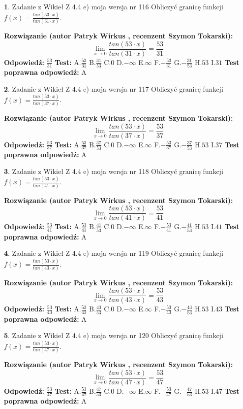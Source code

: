 \documentclass[12pt, a4paper]{article}
\theoremstyle{definition} %
\newtheorem{zad}{}
\newcommand{\zadStart}[1]{\begin{zad}#1\newline}
\newcommand{\zadStop}{\end{zad}}
\newcommand{\rozwStart}[2]{\noindent \textbf{Rozwiązanie (autor #1 , recenzent #2): }\newline}
\newcommand{\rozwStop}{\newline}
\newcommand{\odpStart}{\noindent \textbf{Odpowiedź:}\newline}
\newcommand{\odpStop}{\newline}
\newcommand{\testStart}{\noindent \textbf{Test:}\newline}
\newcommand{\testStop}{\newline}
\newcommand{\kluczStart}{\noindent \textbf{Test poprawna odpowiedź:}\newline}
\newcommand{\kluczStop}{\newline}
\begin{document}
\zadStart{Zadanie z Wikieł Z 4.4 e) moja wersja nr 116}
Obliczyć granicę funkcji $f(x)=\frac{tan(53\cdot x)}{tan(31\cdot x)}$.
\zadStop
\rozwStart{Patryk Wirkus}{Szymon Tokarski}
$$\lim\limits_{x\to 0}\frac{tan(53\cdot x)}{tan(31\cdot x)}=
\frac{53}{31}$$
\rozwStop
\odpStart
$\frac{53}{31}$
\odpStop
\testStart
A.$\frac{53}{31}$
B.$\frac{31}{53}$
C.$0$
D.$-\infty$
E.$\infty$
F.$-\frac{53}{31}$
G.$-\frac{31}{53}$
H.$53$
I.$31$
\testStop
\kluczStart
A
\kluczStop



\zadStart{Zadanie z Wikieł Z 4.4 e) moja wersja nr 117}
Obliczyć granicę funkcji $f(x)=\frac{tan(53\cdot x)}{tan(37\cdot x)}$.
\zadStop
\rozwStart{Patryk Wirkus}{Szymon Tokarski}
$$\lim\limits_{x\to 0}\frac{tan(53\cdot x)}{tan(37\cdot x)}=
\frac{53}{37}$$
\rozwStop
\odpStart
$\frac{53}{37}$
\odpStop
\testStart
A.$\frac{53}{37}$
B.$\frac{37}{53}$
C.$0$
D.$-\infty$
E.$\infty$
F.$-\frac{53}{37}$
G.$-\frac{37}{53}$
H.$53$
I.$37$
\testStop
\kluczStart
A
\kluczStop



\zadStart{Zadanie z Wikieł Z 4.4 e) moja wersja nr 118}
Obliczyć granicę funkcji $f(x)=\frac{tan(53\cdot x)}{tan(41\cdot x)}$.
\zadStop
\rozwStart{Patryk Wirkus}{Szymon Tokarski}
$$\lim\limits_{x\to 0}\frac{tan(53\cdot x)}{tan(41\cdot x)}=
\frac{53}{41}$$
\rozwStop
\odpStart
$\frac{53}{41}$
\odpStop
\testStart
A.$\frac{53}{41}$
B.$\frac{41}{53}$
C.$0$
D.$-\infty$
E.$\infty$
F.$-\frac{53}{41}$
G.$-\frac{41}{53}$
H.$53$
I.$41$
\testStop
\kluczStart
A
\kluczStop



\zadStart{Zadanie z Wikieł Z 4.4 e) moja wersja nr 119}
Obliczyć granicę funkcji $f(x)=\frac{tan(53\cdot x)}{tan(43\cdot x)}$.
\zadStop
\rozwStart{Patryk Wirkus}{Szymon Tokarski}
$$\lim\limits_{x\to 0}\frac{tan(53\cdot x)}{tan(43\cdot x)}=
\frac{53}{43}$$
\rozwStop
\odpStart
$\frac{53}{43}$
\odpStop
\testStart
A.$\frac{53}{43}$
B.$\frac{43}{53}$
C.$0$
D.$-\infty$
E.$\infty$
F.$-\frac{53}{43}$
G.$-\frac{43}{53}$
H.$53$
I.$43$
\testStop
\kluczStart
A
\kluczStop



\zadStart{Zadanie z Wikieł Z 4.4 e) moja wersja nr 120}
Obliczyć granicę funkcji $f(x)=\frac{tan(53\cdot x)}{tan(47\cdot x)}$.
\zadStop
\rozwStart{Patryk Wirkus}{Szymon Tokarski}
$$\lim\limits_{x\to 0}\frac{tan(53\cdot x)}{tan(47\cdot x)}=
\frac{53}{47}$$
\rozwStop
\odpStart
$\frac{53}{47}$
\odpStop
\testStart
A.$\frac{53}{47}$
B.$\frac{47}{53}$
C.$0$
D.$-\infty$
E.$\infty$
F.$-\frac{53}{47}$
G.$-\frac{47}{53}$
H.$53$
I.$47$
\testStop
\kluczStart
A
\kluczStop
\end{document}
